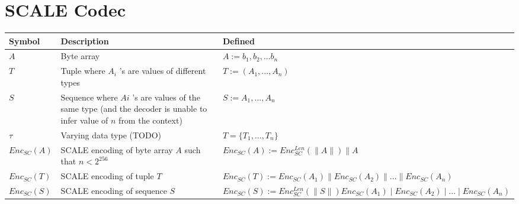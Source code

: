 \documentclass[11pt,a4paper]{article}
\begin{document}
\section*{SCALE Codec}
\begin{center}
 \begin{tabulary}{1.5\textwidth}{LLL}
  \textbf{Symbol} & \textbf{Description} & \textbf{Defined} \\
  \hline
\(A\) &Byte array& \(A := b_1, b_2, ... b_n\) \\
\(T\) &Tuple where \(A_i\) 's are values of different types& \(T := (A_1, ..., A_n)\) \\
\(S\) &Sequence where \(Ai\) 's are values of the same type (and the decoder is unable to infer value of \(n\) from the context)& \(S := A_1, ..., A_n\) \\
\(\tau\) &Varying data type (TODO)& \(T = \{T_1, ..., T_n\}\) \\
\(Enc_{SC}(A)\) &SCALE encoding of byte array \(A\) such that \(n < 2^{256}\) & \(Enc_{SC}(A) := Enc^{Len}_{SC}(\parallel A \parallel)\parallel A\) \\
\(Enc_{SC}(T)\) &SCALE encoding of tuple \(T\) & \(Enc_{SC}(T) := Enc_{SC}(A_1)\parallel Enc_{SC}(A_2)\parallel ... \parallel Enc_{SC}(A_n)\) \\
\(Enc_{SC}(S)\) &SCALE encoding of sequence \(S\) & \(Enc_{SC}(S) := Enc^{Len}_{SC}(\parallel S \parallel) Enc_{SC}(A_1)\mid Enc_{SC}(A_2)\mid ... \mid Enc_{SC}(A_n)\) \\
 \end{tabulary}
\end{center}
\end{document}
